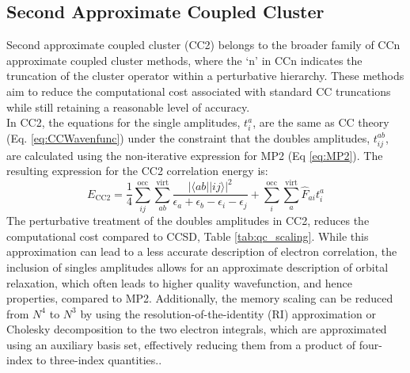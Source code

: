 \subsection{Second Approximate Coupled Cluster}\label{sec:CC2Theory}
Second approximate coupled cluster (CC2)\cite{shavitt2009many} belongs to the broader family of CCn approximate coupled cluster methods, where the `n' in CCn indicates the truncation of the cluster operator within a perturbative hierarchy. These methods aim to reduce the computational cost associated with standard CC truncations while still retaining a reasonable level of accuracy.\\

In CC2, the equations for the single amplitudes, $t^a_i$, are the same as CC theory (Eq. \ref{eq:CCWavenfunc}) under the constraint that the doubles amplitudes, $t^{ab}_{ij}$, are calculated using the non-iterative expression for MP2 (Eq \ref{eq:MP2}). The resulting expression for the CC2 correlation energy is:
\begin{equation}\label{CC2Energy}
    E_{\mathrm{CC2}} = \frac{1}{4}\sum_{ij}^{\mathrm{occ}} \sum_{ab}^{\mathrm{virt}} \frac{|\langle a b || i j \rangle|^2}{\epsilon_a + \epsilon_b - \epsilon_i - \epsilon_j}  + \sum_{i}^{\mathrm{occ}} \sum_{a}^{\mathrm{virt}} \hat{F}_{ai} t^a_i 
\end{equation}
The perturbative treatment of the doubles amplitudes in CC2, reduces the computational cost compared to CCSD, Table \ref{tab:qc_scaling}. While this approximation can lead to a less accurate description of electron correlation, the inclusion of singles amplitudes allows for an approximate description of orbital relaxation, which often leads to higher quality wavefunction, and hence properties, compared to MP2.
Additionally, the memory scaling can be reduced from $N^4$ to $N^3$ by using the resolution-of-the-identity (RI) approximation or Cholesky decomposition to the two electron integrals, which are approximated using an auxiliary basis set, effectively reducing them from a product of four-index to three-index quantities.\cite{hattig2000cc2}.

